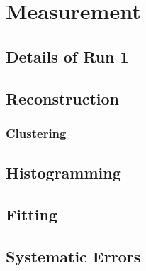 
\chapter{\texorpdfstring{\wa}{wa} Measurement}
\label{chapter:SpinPrecessionMeasurement}
\thispagestyle{myheadings}

\section{Details of Run 1}
\label{sec:Data}

\section{Reconstruction}
\label{sec:ReconWest}

\cite{AFThesis}

\subsection{Clustering}
\label{sec:Clustering}

\section{Histogramming}
\label{sec:Histogramming}

\section{Fitting}
\label{sec:Fitting}

\section{Systematic Errors}
\label{sec:Systematic Errors}
